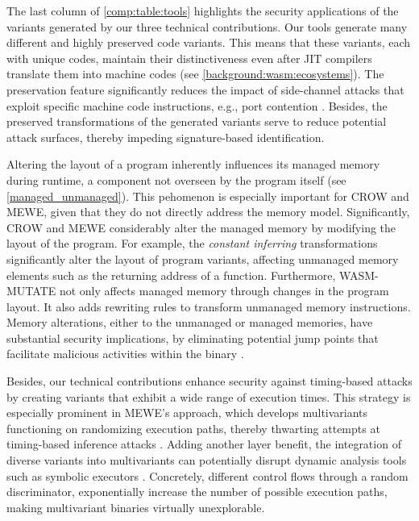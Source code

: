 
The last column of \autoref{comp:table:tools} highlights the security applications of the variants generated by our three technical contributions.
Our tools generate many different and highly preserved code variants. 
This means that these variants, each with unique \Wasm codes, maintain their distinctiveness even after JIT compilers translate them into machine codes (see \autoref{background:wasm:ecosystems}). 
The preservation feature significantly reduces the impact of side-channel attacks that exploit specific machine code instructions, e.g., port contention \cite{10.1145/3488932.3517411}.
Besides, the preserved transformations of the generated variants serve to reduce potential attack surfaces, thereby impeding signature-based identification.

Altering the layout of a \Wasm program inherently influences its managed memory during runtime, a component not overseen by the \Wasm program itself (see \autoref{managed_unmanaged}).
This pehomenon is especially important for CROW and MEWE, given that they do not directly address the \Wasm memory model.
Significantly, CROW and MEWE considerably alter the managed memory by modifying the layout of the \Wasm program.
For example, the \emph{constant inferring} transformations significantly alter the layout of program variants, affecting unmanaged memory elements such as the returning address of a function.
Furthermore, WASM-MUTATE not only affects managed memory through changes in the \Wasm program layout.
It also adds rewriting rules to transform unmanaged memory instructions.
Memory alterations, either to the unmanaged or managed memories, have substantial security implications, by eliminating potential jump points that facilitate malicious activities within the binary \cite{Swivel}.


Besides, our technical contributions enhance security against timing-based attacks by creating variants that exhibit a wide range of execution times. 
This strategy is especially prominent in MEWE’s approach, which develops multivariants functioning on randomizing execution paths, thereby thwarting attempts at timing-based inference attacks \cite{DBLP:conf/ndss/SchnitzlerKBP23}. 
Adding another layer benefit, the integration of diverse variants into multivariants can potentially disrupt dynamic analysis tools such as symbolic executors \cite{wasmixer}. 
Concretely, different control flows through a random discriminator, exponentially increase the number of possible execution paths, making multivariant binaries virtually unexplorable.


